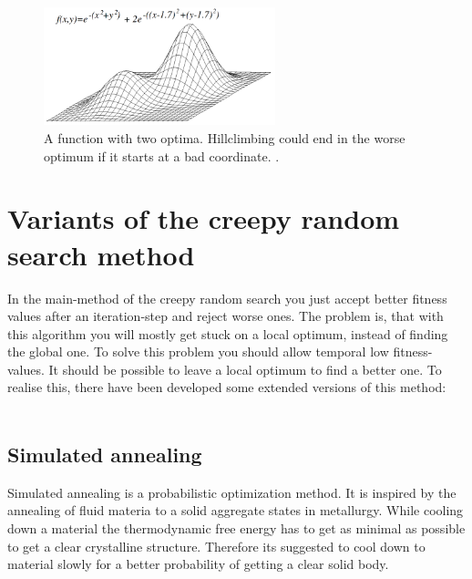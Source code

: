 \documentclass[10pt,a4paper,DIV=11]{scrreprt}
\begin{document}
\begin{center}
	\begin{figure}[H]
		\centering
		\includegraphics[width=0.6\textwidth,scale=1]{files/Local_maximum.png}  
		\caption{A function with two optima. Hillclimbing could end in the worse optimum if it starts at a bad coordinate. \cite{wiki-hill}.}
		\label{fig:hill2}
	\end{figure}
\end{center}


\section{Variants of the creepy random search method}
In the main-method of the creepy random search you just accept better fitness values after an iteration-step and reject worse ones.
The problem is, that with this algorithm you will mostly get stuck on a local optimum, instead of finding the global one.
To solve this problem you should allow temporal low fitness-values. It should be possible to leave a local optimum to find a better one.
To realise this, there have been developed some extended versions of this method: \\

 \\


\subsection{Simulated annealing}
Simulated annealing is a probabilistic optimization method.
It is inspired by the annealing of fluid materia to a solid aggregate states in metallurgy. While cooling down a material the thermodynamic free energy has to get as minimal as possible to get a clear crystalline structure. Therefore its suggested to cool down to material slowly for a better probability of getting a clear solid body.
\end{document}
